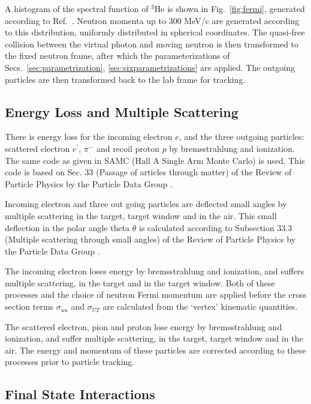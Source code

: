 A histogram of the spectral function of $^3$He is shown in
Fig.~\ref{fig:fermi}, generated according to Ref.~\cite{fermipaper}. Neutron
momenta up to 300 MeV/c are generated according to this distribution, uniformly
distributed in spherical coordinates. The quasi-free collision between the
virtual photon and moving neutron is then transformed to the fixed neutron
frame, after which the parameterizations of Secs.~\ref{sec:parametrization},
\ref{sec:sixparametrizations} are applied. The outgoing particles are then
transformed back to the lab frame for tracking.

\subsection{Energy Loss and Multiple Scattering
\label{sec:energyloss}}

There is energy loss for the incoming electron $e$, and the three outgoing
particles: scattered electron $e^{\prime}$, $\pi^{-}$ and recoil proton $p$ by
bremsstrahlung and ionization.  The same code as given in SAMC (Hall A Single
Arm Monte Carlo) \cite{samc} is used.  This code is based on Sec. 33 (Passage
of articles through matter) of the Review of Particle Physics by the Particle
Data Group \cite{pdg}.

Incoming electron and three out going particles are deflected small angles by
multiple scattering in the target, target window and in the air. This small
deflection in the polar angle theta $\theta$ is calculated according to
Subsection 33.3 (Multiple scattering through small angles) of the Review of Particle
Physics by the Particle Data Group \cite{pdg}.

The incoming electron loses energy by bremsstrahlung and ionization, and
suffers multiple scattering, in the target and in the target window.  Both of
these processes and the choice of neutron Fermi momentum are applied before the
cross section terms $\sigma_{uu}$ and $\sigma_{UT}$ are calculated from the
`vertex' kinematic quantities.

The scattered electron, pion and proton lose energy by bremsstrahlung and
ionization, and suffer multiple scattering, in the target, target window and in
the air.  The energy and momentum of these particles are corrected according to
these processes prior to particle tracking.

\subsection{Final State Interactions
\label{sec:fsi}}

